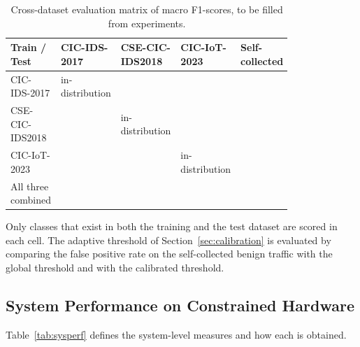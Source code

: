 \begin{table}[H]
\centering
\caption{Cross-dataset evaluation matrix of macro F1-scores, to be filled from experiments.}
\label{tab:crossmatrix}
\begin{tabular}{|>{\raggedright\arraybackslash}p{0.22\linewidth}|>{\raggedright\arraybackslash}p{0.14\linewidth}|>{\raggedright\arraybackslash}p{0.16\linewidth}|>{\raggedright\arraybackslash}p{0.14\linewidth}|>{\raggedright\arraybackslash}p{0.14\linewidth}|}
\hline
\textbf{Train / Test} & \textbf{CIC-IDS-2017} & \textbf{CSE-CIC-IDS2018} & \textbf{CIC-IoT-2023} & \textbf{Self-collected} \\
\hline
CIC-IDS-2017 & in-distribution & & & \\
\hline
CSE-CIC-IDS2018 & & in-distribution & & \\
\hline
CIC-IoT-2023 & & & in-distribution & \\
\hline
All three combined & & & & \\
\hline
\end{tabular}
\end{table}

\noindent Only classes that exist in both the training and the test dataset are scored in each cell. The adaptive threshold of Section~\ref{sec:calibration} is evaluated by comparing the false positive rate on the self-collected benign traffic with the global threshold and with the calibrated threshold.

\subsection{System Performance on Constrained Hardware}\label{sec:5.10.3}
\label{sec:sysperf}
\noindent Table~\ref{tab:sysperf} defines the system-level measures and how each is obtained.

